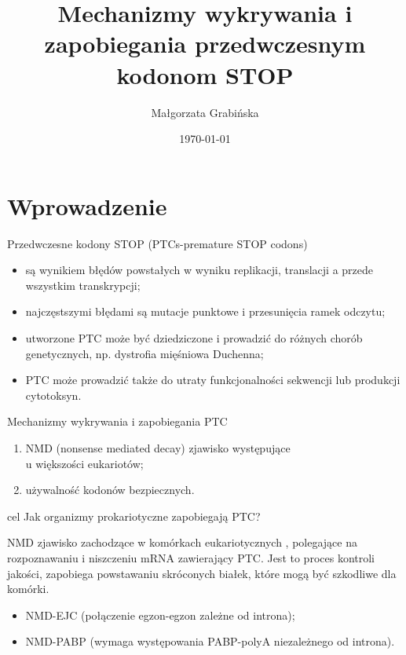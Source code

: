 \documentclass[compress,clock,xcolor=dvipsnames,hyperref={pdfpagelabels=false},final]{beamer}
\title[] 
{Mechanizmy wykrywania i zapobiegania przedwczesnym kodonom STOP}
\author{Małgorzata Grabińska}
\institute
{
  Zakład Genomiki, Wydział Biotechnologii\\
  Uniwersytet Wrocławski\\
{\it malgorzata.grabinska@smorfland.uni.wroc.pl}

}
\date{\today}
\begin{document}
\begin{frame}[plain]

  \titlepage

\end{frame}


\section{Wprowadzenie}

\begin{frame}{Przedwczesne kodony STOP (PTCs-premature STOP codons)}
\pause
\begin{itemize}
\item są wynikiem błędów powstałych w wyniku replikacji, translacji a przede wszystkim
transkrypcji;
\pause \item najczęstszymi błędami są mutacje punktowe i przesunięcia ramek odczytu;
\pause \item utworzone PTC może być dziedziczone i prowadzić do różnych chorób genetycznych, 
np. dystrofia mięśniowa Duchenna;
\pause \item PTC może prowadzić także do utraty funkcjonalności sekwencji lub 
produkcji cytotoksyn.
\end{itemize} 
\end{frame}

\begin{frame}{Mechanizmy wykrywania i zapobiegania PTC}
\begin{enumerate}
\pause \item NMD (nonsense mediated decay) zjawisko występujące \\u większości eukariotów;
\pause \item używalność kodonów bezpiecznych.
\end{enumerate}
\pause
\begin{block}{cel}
 Jak organizmy prokariotyczne zapobiegają PTC?
\end{block}
\end{frame}

\begin{frame}
\begin{block}{NMD}
zjawisko zachodzące w komórkach eukariotycznych , polegające na rozpoznawaniu i niszczeniu mRNA zawierający
PTC. Jest to proces kontroli jakości, zapobiega powstawaniu skróconych białek, które mogą być szkodliwe dla komórki.
\end{block}
\pause
\begin{itemize}
 \item NMD-EJC (połączenie egzon-egzon zależne od introna);
\pause \item NMD-PABP (wymaga występowania PABP-polyA niezależnego od introna).
\end{itemize}
\end{frame}
\end{document}
